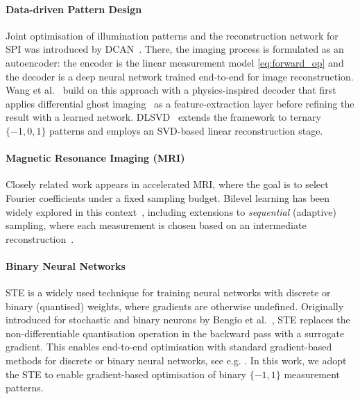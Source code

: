 \documentclass[lettersize,journal]{IEEEtran}
\begin{document}
\paragraph{Data-driven Pattern Design} Joint optimisation of illumination patterns and the reconstruction network for SPI was introduced by DCAN~\cite{Higham_2018_DeepLearningRealtime}.
There, the imaging process is formulated as an autoencoder: the encoder is the linear measurement model \eqref{eq:forward_op} and the decoder is a deep neural network trained end-to-end for image reconstruction. 
Wang et al.~\cite{Wang_2022_SinglepixelImagingUsing} build on this approach with a physics-inspired decoder that first applies differential ghost imaging~\cite{Ferri_2010_DifferentialGhostImaging} as a feature-extraction layer before refining the result with a learned network.
DLSVD~\cite{Deng_2024_SinglePixelImagingBased} extends the framework to ternary $\{-1,0,1\}$ patterns and employs an SVD-based linear reconstruction stage.

\paragraph{Magnetic Resonance Imaging (MRI)}
Closely related work appears in accelerated MRI, where the goal is to select Fourier coefficients under a fixed sampling budget.
Bilevel learning has been widely explored in this context~\cite{Sherry_2020_LearningSamplingPattern,Baldassarre_2016_LearningBasedCompressiveSubsampling,Gozcu_2018_LearningBasedCompressiveMRI,Ravula_2023_OptimizingSamplingPatterns}, including extensions to \emph{sequential} (adaptive) sampling, where each measurement is chosen based on an intermediate reconstruction~\cite{Yin_2021_EndtoEndSequentialSampling}.

\paragraph{Binary Neural Networks} STE is a widely used technique for training neural networks with discrete or binary (quantised) weights, where gradients are otherwise undefined. Originally introduced for stochastic and binary neurons by Bengio et al.~\cite{Bengio_2013_EstimatingPropagatingGradients},  STE replaces the non-differentiable quantisation operation in the backward pass with a surrogate gradient. This enables end-to-end optimisation with standard gradient-based methods for discrete or binary neural networks, see e.g. \cite{courbariaux2015binaryconnect,hubara2016binarized}. In this work, we adopt the STE to enable gradient-based optimisation of binary $\{-1,1\}$ measurement patterns.
\end{document}
